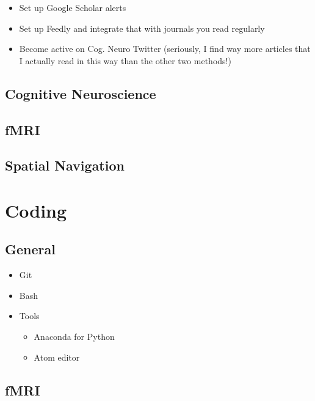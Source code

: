 \documentclass[
  12pt,
]{book}
\begin{document}
\begin{itemize}
\item
  Set up Google Scholar alerts
\item
  Set up Feedly and integrate that with journals you read regularly
\item
  Become active on Cog. Neuro Twitter (seriously, I find way more articles that I actually read in this way than the other two methods!)
\end{itemize}

\hypertarget{cognitive-neuroscience}{%
\subsection{Cognitive Neuroscience}\label{cognitive-neuroscience}}

\hypertarget{fmri}{%
\subsection{fMRI}\label{fmri}}

\hypertarget{spatial-navigation}{%
\subsection{Spatial Navigation}\label{spatial-navigation}}

\hypertarget{coding}{%
\section{Coding}\label{coding}}

\hypertarget{general}{%
\subsection{General}\label{general}}

\begin{itemize}
\item
  Git
\item
  Bash
\item
  Tools

  \begin{itemize}
  \item
    Anaconda for Python
  \item
    Atom editor
  \end{itemize}
\end{itemize}

\hypertarget{fmri-1}{%
\subsection{fMRI}\label{fmri-1}}
\end{document}
